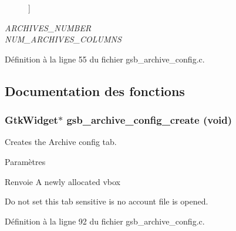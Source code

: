 \begin{Desc}
\begin{description}
{}]\item[{\em 
ARCHIVES\_\-NUMBER\label{gsb__archive__config_8c_a5a5df3b02b66dc0144edab963b8000bba6658eff7cf9f330915f448c2041ca239}
}]\item[{\em 
NUM\_\-ARCHIVES\_\-COLUMNS\label{gsb__archive__config_8c_a5a5df3b02b66dc0144edab963b8000bba845c7d68e3295a5d43d0a0b770d2ce95}
}]\end{description}
\end{Desc}



Définition à la ligne 55 du fichier gsb\_\-archive\_\-config.c.



\subsection{Documentation des fonctions}
\subsubsection[{gsb\_\-archive\_\-config\_\-create}]{\setlength{\rightskip}{0pt plus 5cm}GtkWidget$\ast$ gsb\_\-archive\_\-config\_\-create (void)}\label{gsb__archive__config_8c_a58f2c999f923a1d2ed35bd88b206b95d}
Creates the Archive config tab.


\begin{DoxyParams}{Paramètres}
\item[{\em }]\end{DoxyParams}
\begin{DoxyReturn}{Renvoie}
A newly allocated vbox 
\end{DoxyReturn}


Do not set this tab sensitive is no account file is opened. 



Définition à la ligne 92 du fichier gsb\_\-archive\_\-config.c.



